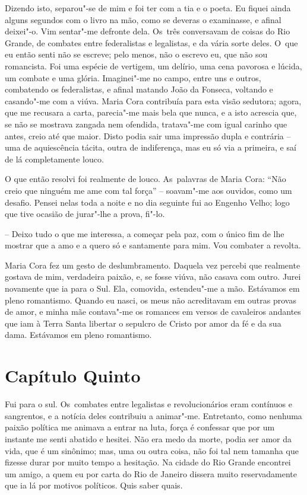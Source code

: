 Dizendo isto, separou"-se de mim e foi ter com a tia e o poeta. Eu fiquei
ainda alguns segundos com o livro na mão, como se deveras o examinasse,
e afinal deixei"-o. Vim sentar"-me defronte dela. Os~três conversavam de
coisas do Rio Grande, de combates entre federalistas e legalistas, e da
vária sorte deles. O~que eu então senti não se escreve; pelo menos, não
o escrevo eu, que não sou romancista. Foi uma espécie de vertigem, um
delírio, uma cena pavorosa e lúcida, um combate e uma glória.
Imaginei"-me no campo, entre uns e outros, combatendo os federalistas, e
afinal matando João da Fonseca, voltando e casando"-me com a viúva. Maria
Cora contribuía para esta visão sedutora; agora, que me recusara a
carta, parecia"-me mais bela que nunca, e a isto acrescia que, se não se
mostrava zangada nem ofendida, tratava"-me com igual carinho que antes,
creio até que maior. Disto podia sair uma impressão dupla e contrária --
uma de aquiescência tácita, outra de indiferença, mas eu só via a
primeira, e saí de lá completamente louco.

O que então resolvi foi realmente de louco. As~palavras de Maria Cora:
``Não creio que ninguém me ame com tal força'' -- soavam"-me aos ouvidos,
como um desafio. Pensei nelas toda a noite e no dia seguinte fui ao
Engenho Velho; logo que tive ocasião de jurar"-lhe a prova, fi"-lo.

-- Deixo tudo o que me interessa, a começar pela paz, com o único fim de
lhe mostrar que a amo e a quero só e santamente para mim. Vou combater a
revolta.

Maria Cora fez um gesto de deslumbramento. Daquela vez percebi que
realmente gostava de mim, verdadeira paixão, e, se fosse viúva, não
casava com outro. Jurei novamente que ia para o Sul. Ela, comovida,
estendeu"-me a mão. Estávamos em pleno romantismo. Quando eu nasci, os
meus não acreditavam em outras provas de amor, e minha mãe contava"-me os
romances em versos de cavaleiros andantes que iam à Terra Santa libertar
o sepulcro de Cristo por amor da fé e da sua dama. Estávamos em pleno
romantismo.

\section{Capítulo Quinto}

Fui para o sul. Os~combates entre legalistas e revolucionários eram
contínuos e sangrentos, e a notícia deles contribuiu a animar"-me.
Entretanto, como nenhuma paixão política me animava a entrar na luta,
força é confessar que por um instante me senti abatido e hesitei. Não
era medo da morte, podia ser amor da vida, que é um sinônimo; mas, uma
ou outra coisa, não foi tal nem tamanha que fizesse durar por muito
tempo a hesitação. Na cidade do Rio Grande encontrei um amigo, a quem eu
por carta do Rio de Janeiro dissera muito reservadamente que ia lá por
motivos políticos. Quis saber quais.

